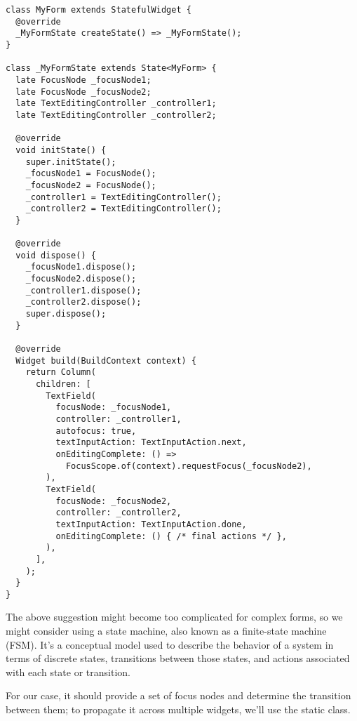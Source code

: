 \begin{lstlisting}
class MyForm extends StatefulWidget {
  @override
  _MyFormState createState() => _MyFormState();
}

class _MyFormState extends State<MyForm> {
  late FocusNode _focusNode1;
  late FocusNode _focusNode2;
  late TextEditingController _controller1;
  late TextEditingController _controller2;

  @override
  void initState() {
    super.initState();
    _focusNode1 = FocusNode();
    _focusNode2 = FocusNode();
    _controller1 = TextEditingController();
    _controller2 = TextEditingController();
  }

  @override
  void dispose() {
    _focusNode1.dispose();
    _focusNode2.dispose();
    _controller1.dispose();
    _controller2.dispose();
    super.dispose();
  }

  @override
  Widget build(BuildContext context) {
    return Column(
      children: [
        TextField(
          focusNode: _focusNode1,
          controller: _controller1,
          autofocus: true,
          textInputAction: TextInputAction.next,
          onEditingComplete: () =>
            FocusScope.of(context).requestFocus(_focusNode2),
        ),
        TextField(
          focusNode: _focusNode2,
          controller: _controller2,
          textInputAction: TextInputAction.done,
          onEditingComplete: () { /* final actions */ },
        ),
      ],
    );
  }
}
\end{lstlisting}

\noindent The above suggestion might become too complicated for complex forms, so we might consider using a state machine, 
also known as a finite-state machine (FSM). It's a conceptual model used to describe the behavior of a system in terms 
of discrete states, transitions between those states, and actions associated with each state or transition.

For our case, it should provide a set of focus nodes and determine the transition between them; to propagate it across 
multiple widgets, we'll use the static class.

